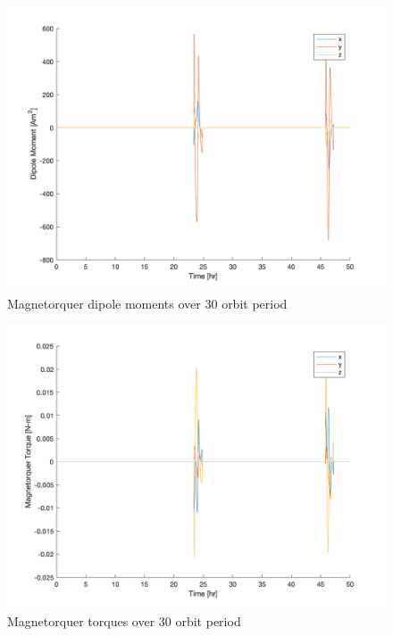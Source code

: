 \begin{figure}[H]
\centering
\includegraphics[scale=0.3]{Images/ps10_dipole_moment.png}
\caption{Magnetorquer dipole moments over 30 orbit period}
\label{fig:ps10_dipole_moment}
\end{figure}

\begin{figure}[H]
\centering
\includegraphics[scale=0.3]{Images/ps10_mag_torque.png}
\caption{Magnetorquer torques over 30 orbit period}
\label{fig:ps10_mag_torque}
\end{figure}

